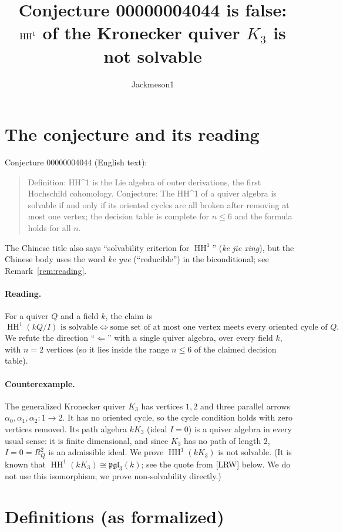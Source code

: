 \documentclass[11pt]{article}
\title{Conjecture 00000004044 is false:\\ $\HH^1$ of the Kronecker quiver $K_3$ is not solvable}
\author{Jackmeson1}
\date{}
\renewcommand{\_}{\oldus\allowbreak}
\theoremstyle{definition}
\theoremstyle{remark}
\newcommand{\HH}{\operatorname{HH}}
\begin{document}
\maketitle

\section{The conjecture and its reading}

Conjecture 00000004044 (English text):
\begin{quote}
Definition: HH\^{}1 is the Lie algebra of outer derivations, the first Hochschild cohomology.
Conjecture: The HH\^{}1 of a quiver algebra is solvable if and only if its oriented cycles are all
broken after removing at most one vertex; the decision table is complete for $n \le 6$ and the
formula holds for all $n$.
\end{quote}
The Chinese title also says ``solvability criterion for $\HH^1$'' (\emph{ke jie xing}), but the
Chinese body uses the word \emph{ke yue} (``reducible'') in the biconditional; see
Remark~\ref{rem:reading}.

\paragraph{Reading.} For a quiver $Q$ and a field $k$, the claim is
\[
  \HH^1(kQ/I) \text{ is solvable} \iff \text{some set of at most one vertex meets every oriented cycle of } Q .
\]
We refute the direction ``$\Leftarrow$'' with a single quiver algebra, over every field $k$, with
$n = 2$ vertices (so it lies inside the range $n \le 6$ of the claimed decision table).

\paragraph{Counterexample.} The generalized Kronecker quiver $K_3$ has vertices $1,2$ and three
parallel arrows $\alpha_0,\alpha_1,\alpha_2 : 1 \to 2$. It has no oriented cycle, so the cycle
condition holds with zero vertices removed. Its path algebra $kK_3$ (ideal $I=0$) is a quiver
algebra in every usual sense: it is finite dimensional, and since $K_3$ has no path of length $2$,
$I = 0 = R_Q^2$ is an admissible ideal. We prove $\HH^1(kK_3)$ is not solvable.
(It is known that $\HH^1(kK_3) \cong \mathfrak{pgl}_3(k)$; see the quote from [LRW] below. We do
not use this isomorphism; we prove non-solvability directly.)

\section{Definitions (as formalized)}
\end{document}
